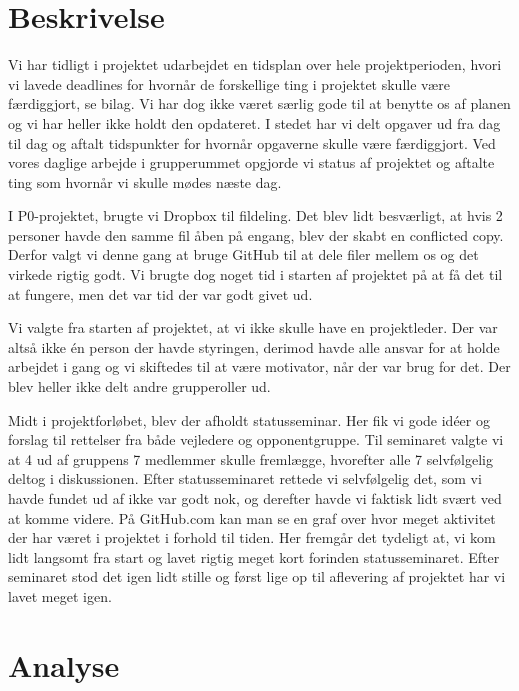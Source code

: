 \section{Beskrivelse}
Vi har tidligt i projektet udarbejdet en tidsplan over hele projektperioden, hvori vi lavede deadlines for hvornår de forskellige ting i projektet skulle være færdiggjort, se bilag. Vi har dog ikke været særlig gode til at benytte os af planen og vi har heller ikke holdt den opdateret. I stedet har vi delt opgaver ud fra dag til dag og aftalt tidspunkter for hvornår opgaverne skulle være færdiggjort. Ved vores daglige arbejde i grupperummet opgjorde vi status af projektet og aftalte ting som hvornår vi skulle mødes næste dag. 

I P0-projektet, brugte vi Dropbox til fildeling. Det blev lidt besværligt, at hvis 2 personer havde den samme fil åben på engang, blev der skabt en conflicted copy. Derfor valgt vi denne gang at bruge GitHub til at dele filer mellem os og det virkede rigtig godt. Vi brugte dog noget tid i starten af projektet på at få det til at fungere, men det var tid der var godt givet ud. 

Vi valgte fra starten af projektet, at vi ikke skulle have en projektleder. Der var altså ikke én person der havde styringen, derimod havde alle ansvar for at holde arbejdet i gang og vi skiftedes til at være motivator, når der var brug for det. Der blev heller ikke delt andre grupperoller ud.  

Midt i projektforløbet, blev der afholdt statusseminar. Her fik vi gode idéer og forslag til rettelser fra både vejledere og opponentgruppe. Til seminaret valgte vi at 4 ud af gruppens 7 medlemmer skulle fremlægge, hvorefter alle 7 selvfølgelig deltog i diskussionen. Efter statusseminaret rettede vi selvfølgelig det, som vi havde fundet ud af ikke var godt nok, og derefter havde vi faktisk lidt svært ved at komme videre. På GitHub.com kan man se en graf over hvor meget aktivitet der har været i projektet i forhold til tiden. Her fremgår det tydeligt at, vi kom lidt langsomt fra start og lavet rigtig meget kort forinden statusseminaret. Efter seminaret stod det igen lidt stille og først lige op til aflevering af projektet har vi lavet meget igen. 

\section{Analyse}

